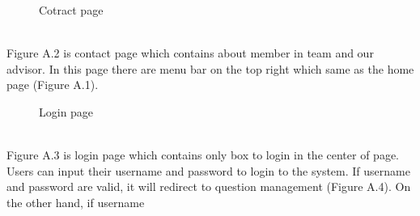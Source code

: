\documentclass[12pt,oneside,openright,a4paper]{cpe-english-project}
\begin{document}
\begin{figure}[!h]\centering
{}
\caption{Cotract page}\label{fig:Cotract page}
\end{figure}\\
Figure A.2 is contact page which contains about member in team and our advisor. In 
this page there are menu bar on the top right which same as the home page (Figure A.1).\\
\begin{figure}[!h]\centering
{}
\caption{Login page}\label{fig:Login page}
\end{figure}\\
Figure A.3 is login page which contains only box to login in the center of page. Users 
can input their username and password to login to the system. If username and password are 
valid, it will redirect to question management (Figure A.4). On the other hand, if username 
\end{document}
